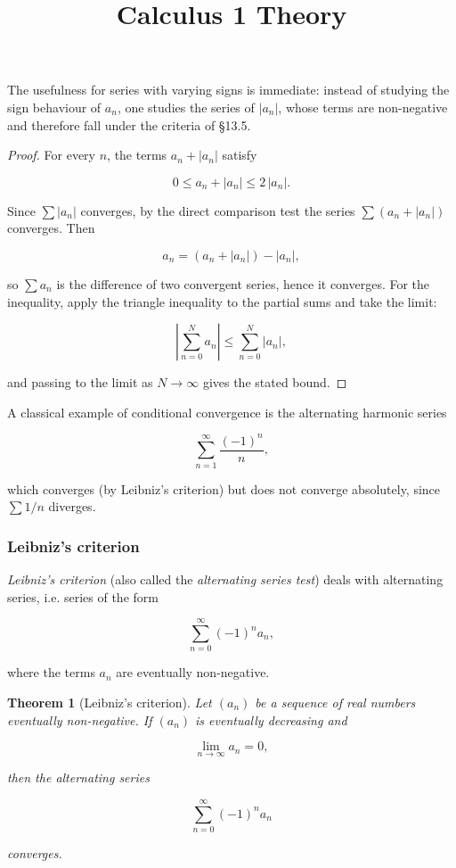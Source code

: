 \documentclass[11pt,a4paper]{article} \usepackage[T1]{fontenc}
\theoremstyle{plain} \newtheorem{theorem}{Theorem} \title{Calculus 1 Theory}
\begin{document}
The usefulness for series with varying signs is immediate: instead of studying
the sign behaviour of $a_n$, one studies the series of $|a_n|$, whose terms are
non-negative and therefore fall under the criteria of \S 13.5.

\begin{proof}
For every $n$, the terms $a_n + |a_n|$ satisfy

\[
0 \le a_n + |a_n| \le 2\,|a_n|.
\]

Since $\sum |a_n|$ converges, by the direct comparison test the series $\sum
(a_n+|a_n|)$ converges. Then

\[
a_n = (a_n + |a_n|) - |a_n|,
\]

so $\sum a_n$ is the difference of two convergent series, hence it converges.
For the inequality, apply the triangle inequality to the partial sums and take
the limit:

\[
\left|\sum_{n=0}^{N} a_n\right| \le \sum_{n=0}^{N} |a_n|,
\]

and passing to the limit as $N\to\infty$ gives the stated bound.
\end{proof}

A classical example of conditional convergence is the alternating harmonic
series

\[
\sum_{n=1}^{\infty} \frac{(-1)^n}{n},
\]

which converges (by Leibniz's criterion) but does not converge absolutely,
since $\sum 1/n$ diverges.

\subsubsection {Leibniz's criterion}

\emph{Leibniz's criterion} (also called the \emph{alternating series test})
deals with alternating series, i.e. series of the form

\[
\sum_{n=0}^{\infty} (-1)^n a_n,
\]

where the terms $a_n$ are eventually non-negative.

\begin{theorem}
[Leibniz's criterion] Let $(a_n)$ be a sequence of real numbers eventually
non-negative. If $(a_n)$ is eventually decreasing and

\[
\lim_{n\to\infty} a_n = 0,
\]

then the alternating series

\[
\sum_{n=0}^{\infty} (-1)^n a_n
\]

converges.
\end{theorem}
\end{document}
